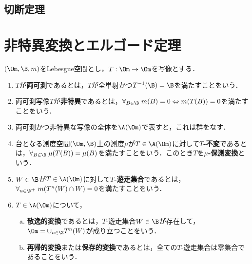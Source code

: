 \documentclass[uplatex,dvipdfmx]{jsreport}
\begin{document}
\begin{theorem}
    
\end{theorem}

\subsection{切断定理}

\section{非特異変換とエルゴード定理}

\begin{definition}
    $(\Om,\B,m)$をLebesgue空間とし，$T:\Om\to\Om$を写像とする．
    \begin{enumerate}
        \item $T$が\textbf{両可測}であるとは，$T$が全単射かつ$T^{-1}(\B)=\B$を満たすことをいう．
        \item 両可測写像$T$が\textbf{非特異}であるとは，$\forall_{B\in\B}\;m(B)=0\Leftrightarrow m(T(B))=0$を満たすことをいう．
        \item 両可測かつ非特異な写像の全体を$\A(\Om)$で表すと，これは群をなす．
        \item 台となる測度空間$(\Om,\B)$上の測度$\mu$が$T\in\A(\Om)$に対して\textbf{$T$-不変}であるとは，$\forall_{B\in\B}\;\mu(T(B))=\mu(B)$を満たすことをいう．このとき$T$を\textbf{$\mu$-保測変換}という．
        \item $W\in\B$が$T\in\A(\Om)$に対して\textbf{$T$-遊走集合}であるとは，$\forall_{n\in\N^+}\;m(T^n(W)\cap W)=0$を満たすことをいう．
        \item $T\in\A(\Om)$について，
        \begin{enumerate}[(a)]
            \item \textbf{散逸的変換}であるとは，$T$-遊走集合$W\in\B$が存在して，$\Om=\cup_{n\in\Z}T^n(W)$が成り立つことをいう．
            \item \textbf{再帰的変換}または\textbf{保存的変換}であるとは，全ての$T$-遊走集合は零集合であることをいう．
        \end{enumerate}
    \end{enumerate}
\end{definition}
\end{document}
